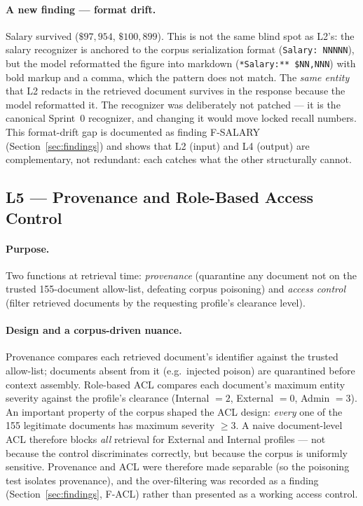 \documentclass[11pt,a4paper]{article}
\newcommand{\code}[1]{\texttt{\small #1}}
\begin{document}
\paragraph{A new finding --- format drift.} Salary survived ($\$97{,}954$, $\$100{,}899$). This is not the same blind spot as L2's: the salary recognizer is anchored to the corpus serialization format (\code{Salary: NNNNN}), but the model reformatted the figure into markdown (\code{**Salary:** \$NN,NNN}) with bold markup and a comma, which the pattern does not match. The \emph{same entity} that L2 redacts in the retrieved document survives in the response because the model reformatted it. The recognizer was deliberately not patched --- it is the canonical Sprint~0 recognizer, and changing it would move locked recall numbers. This format-drift gap is documented as finding F-SALARY (Section~\ref{sec:findings}) and shows that L2 (input) and L4 (output) are complementary, not redundant: each catches what the other structurally cannot.

\subsection{L5 --- Provenance and Role-Based Access Control}
\label{sec:l5}

\paragraph{Purpose.} Two functions at retrieval time: \emph{provenance} (quarantine any document not on the trusted 155-document allow-list, defeating corpus poisoning) and \emph{access control} (filter retrieved documents by the requesting profile's clearance level).

\paragraph{Design and a corpus-driven nuance.} Provenance compares each retrieved document's identifier against the trusted allow-list; documents absent from it (e.g.\ injected poison) are quarantined before context assembly. Role-based ACL compares each document's maximum entity severity against the profile's clearance (Internal $=2$, External $=0$, Admin $=3$). An important property of the corpus shaped the ACL design: \emph{every} one of the 155 legitimate documents has maximum severity $\geq 3$. A naive document-level ACL therefore blocks \emph{all} retrieval for External and Internal profiles --- not because the control discriminates correctly, but because the corpus is uniformly sensitive. Provenance and ACL were therefore made separable (so the poisoning test isolates provenance), and the over-filtering was recorded as a finding (Section~\ref{sec:findings}, F-ACL) rather than presented as a working access control.
\end{document}

